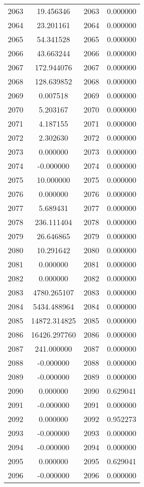 \documentclass[12pt]{article}
\begin{document}
\begin{longtable}{@{}cccc@{}}
2063 & 19.456346 & 2063 & 0.000000 \\
2064 & 23.201161 & 2064 & 0.000000 \\
2065 & 54.341528 & 2065 & 0.000000 \\
2066 & 43.663244 & 2066 & 0.000000 \\
2067 & 172.944076 & 2067 & 0.000000 \\
2068 & 128.639852 & 2068 & 0.000000 \\
2069 & 0.007518 & 2069 & 0.000000 \\
2070 & 5.203167 & 2070 & 0.000000 \\
2071 & 4.187155 & 2071 & 0.000000 \\
2072 & 2.302630 & 2072 & 0.000000 \\
2073 & 0.000000 & 2073 & 0.000000 \\
2074 & -0.000000 & 2074 & 0.000000 \\
2075 & 10.000000 & 2075 & 0.000000 \\
2076 & 0.000000 & 2076 & 0.000000 \\
2077 & 5.689431 & 2077 & 0.000000 \\
2078 & 236.111404 & 2078 & 0.000000 \\
2079 & 26.646865 & 2079 & 0.000000 \\
2080 & 10.291642 & 2080 & 0.000000 \\
2081 & 0.000000 & 2081 & 0.000000 \\
2082 & 0.000000 & 2082 & 0.000000 \\
2083 & 4780.265107 & 2083 & 0.000000 \\
2084 & 5434.488964 & 2084 & 0.000000 \\
2085 & 14872.314825 & 2085 & 0.000000 \\
2086 & 16426.297760 & 2086 & 0.000000 \\
2087 & 241.000000 & 2087 & 0.000000 \\
2088 & -0.000000 & 2088 & 0.000000 \\
2089 & -0.000000 & 2089 & 0.000000 \\
2090 & 0.000000 & 2090 & 0.629041 \\
2091 & -0.000000 & 2091 & 0.000000 \\
2092 & 0.000000 & 2092 & 0.952273 \\
2093 & -0.000000 & 2093 & 0.000000 \\
2094 & -0.000000 & 2094 & 0.000000 \\
2095 & 0.000000 & 2095 & 0.629041 \\
2096 & -0.000000 & 2096 & 0.000000 \\

\end{longtable}
\end{document}
